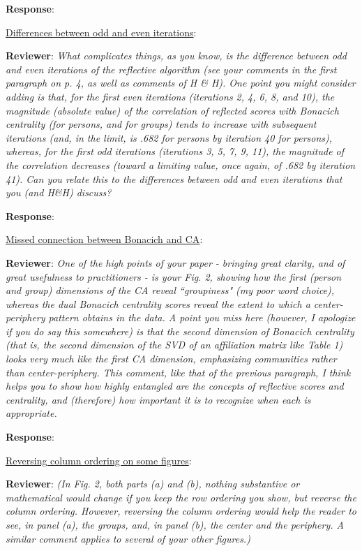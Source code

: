 \documentclass{article}
\begin{document}
\textbf{Response}:

\underline{Differences between odd and even iterations}:

\textbf{Reviewer}: \textit{What complicates things, as you know, is the difference between odd and even iterations of the reflective algorithm (see your comments in the first paragraph on p. 4, as well as comments of H \& H). One point you might consider adding is that, for the first even iterations (iterations 2, 4, 6, 8, and 10), the magnitude (absolute value) of the correlation of reflected scores with Bonacich centrality (for persons, and for groups) tends to increase with subsequent iterations (and, in the limit, is .682 for persons by iteration 40 for persons), whereas, for the first odd iterations (iterations 3, 5, 7, 9, 11), the magnitude of the correlation decreases (toward a limiting value, once again, of .682 by iteration 41). Can you relate this to the differences between odd and even iterations that you (and H\&H) discuss?}

\textbf{Response}:

\underline{Missed connection between Bonacich and CA}:

\textbf{Reviewer}: \textit{One of the high points of your paper - bringing great clarity, and of great usefulness to practitioners - is your Fig. 2, showing how the first (person and group) dimensions of the CA reveal ``groupiness" (my poor word choice), whereas the dual Bonacich centrality scores reveal the extent to which a center-periphery pattern obtains in the data. A point you miss here (however, I apologize if you do say this somewhere) is that the second dimension of Bonacich centrality (that is, the second dimension of the SVD of an affiliation matrix like Table 1) looks very much like the first CA dimension, emphasizing communities rather than center-periphery. This comment, like that of the previous paragraph, I think helps you to show how highly entangled are the concepts of reflective scores and centrality, and (therefore) how important it is to recognize when each is appropriate.}

\textbf{Response}:

\underline{Reversing column ordering on some figures}:

\textbf{Reviewer}: \textit{(In Fig. 2, both parts (a) and (b), nothing substantive or mathematical would change if you keep the row ordering you show, but reverse the column ordering. However, reversing the column ordering would help the reader to see, in panel (a), the groups, and, in panel (b), the center and the periphery. A similar comment applies to several of your other figures.)}
\end{document}

